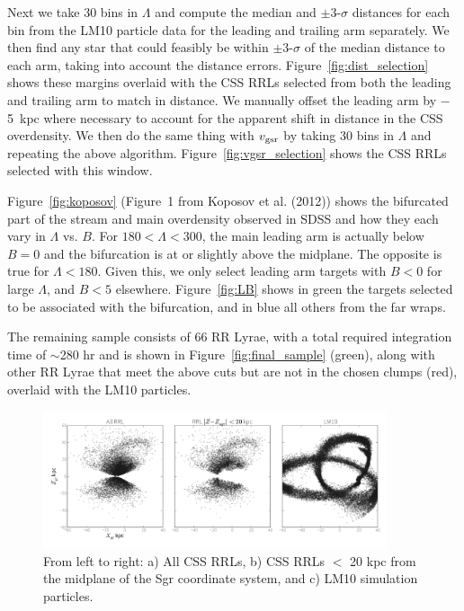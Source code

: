 \documentclass[letterpaper,12pt,preprint]{aastex}
\begin{document}
Next we take 30 bins in $\Lambda$ and compute the median and $\pm$3-$\sigma$ distances for each bin from the LM10 particle data for the leading and trailing arm separately. We then find any star that could feasibly be within $\pm$3-$\sigma$ of the median distance to each arm, taking into account the distance errors. Figure~\ref{fig:dist_selection} shows these margins overlaid with the CSS RRLs selected from both the leading and trailing arm to match in distance. We manually offset the leading arm by $-$5~kpc where necessary to account for the apparent shift in distance in the CSS overdensity. We then do the same thing with $v_{\rm gsr}$ by taking 30 bins in $\Lambda$ and repeating the above algorithm. Figure~\ref{fig:vgsr_selection} shows the CSS RRLs selected with this window. 

Figure~\ref{fig:koposov} (Figure~1 from Koposov et al. (2012)) shows the bifurcated part of the stream and main overdensity observed in SDSS and how they each vary in $\Lambda$ vs. $B$. For $180 < \Lambda < 300$, the main leading arm is actually below $B=0$ and the bifurcation is at or slightly above the midplane. The opposite is true for $\Lambda < 180$. Given this, we only select leading arm targets with $B<0$ for large $\Lambda$, and $B<5$ elsewhere. Figure~\ref{fig:LB} shows in green the targets selected to be associated with the bifurcation, and in blue all others from the far wraps.

The remaining sample consists of 66 RR Lyrae, with a total required integration time of $\sim$280 hr and is shown in Figure~\ref{fig:final_sample} (green), along with other RR Lyrae that meet the above cuts but are not in the chosen clumps (red), overlaid with the LM10 particles.

\begin{figure}
\begin{center}
\includegraphics[width=0.9\textwidth]{catalina_all.pdf}
\caption{ From left to right: a) All CSS RRLs, b) CSS RRLs $<$ 20 kpc from the midplane of the Sgr coordinate system, and c) LM10 simulation particles. }\label{fig:css_all}
\end{center}
\end{figure}
\end{document}
